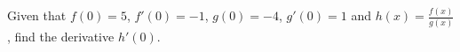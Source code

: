 Given that  $f(0)=5$, $f'(0)=-1$, $g(0)=-4$, $g'(0)=1$ and $h(x)=\frac{f(x)}{g(x)}$, find the derivative $h'(0)$.

